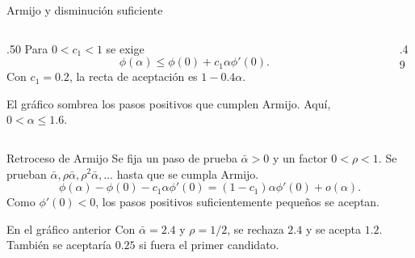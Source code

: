 \documentclass[aspectratio=169,12pt]{beamer}
\begin{document}
\begin{frame}{Armijo y disminución suficiente}
\begin{columns}[c,onlytextwidth]
\begin{column}{.50\textwidth}
Para $0<c_1<1$ se exige
\[
 \phi(\alpha)\le\phi(0)+c_1\alpha\phi'(0).
\]
Con $c_1=0.2$, la recta de aceptación es $1-0.4\alpha$.
\medskip

El gráfico sombrea los pasos positivos que cumplen Armijo.
Aquí, $0<\alpha\le 1.6$.
\end{column}
\begin{column}{.49\textwidth}
\centering
{}
\end{column}
\end{columns}
\end{frame}

\begin{frame}{Retroceso de Armijo}
Se fija un paso de prueba $\bar\alpha>0$ y un factor $0<\rho<1$.
Se prueban $\bar\alpha,\rho\bar\alpha,\rho^2\bar\alpha,\ldots$ hasta
que se cumpla Armijo.
\[
 \phi(\alpha)-\phi(0)-c_1\alpha\phi'(0)
   =(1-c_1)\alpha\phi'(0)+o(\alpha).
\]
Como $\phi'(0)<0$, los pasos positivos suficientemente pequeños se aceptan.
\begin{exampleblock}{En el gráfico anterior}
Con $\bar\alpha=2.4$ y $\rho=1/2$, se rechaza $2.4$ y se acepta $1.2$.
También se aceptaría $0.25$ si fuera el primer candidato.
\end{exampleblock}
\end{frame}
\end{document}
